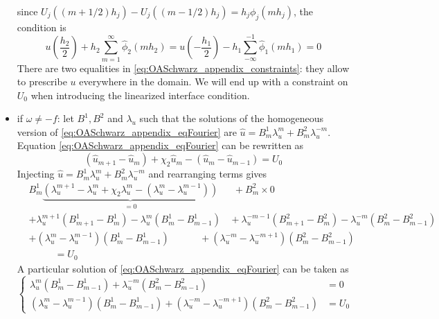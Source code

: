 \begin{appendix}
\begin{itemize}
		since $U_j((m+1/2)h_j) - U_j((m-1/2)h_j) =
		h_j \phi_j(m h_j)$,
		the condition is
	\begin{equation}
		\label{eq:OASchwarz_appendix_constraints}
		u(\frac{h_2}{2}) +
		h_2 \sum^\infty_{m=1} \widehat{\phi}_2(m h_2)
		= u(-\frac{h_1}{2})-
		h_1 \sum^{-1}_{-\infty} \widehat{\phi}_1(m h_1) = 0
	\end{equation}
	There are two equalities in
	\eqref{eq:OASchwarz_appendix_constraints}: they
	allow to prescribe $u$ everywhere in the domain.
	We will end up with a constraint on $U_0$ when
	introducing the linearized interface condition.
\item if $\omega \neq -f$:
	let $B^1, B^2$ and $\lambda_u$ such that
	the solutions of the homogeneous version of
	\eqref{eq:OASchwarz_appendix_eqFourier} are
		$\widehat{u} = B^1_m \lambda_u^m +
			B^2_m \lambda_u^{-m}$.
	Equation \eqref{eq:OASchwarz_appendix_eqFourier}
	can be rewritten as
	\begin{equation}
		(\widehat{u}_{m+1} - \widehat{u}_{m})
		+\chi_2 \widehat{u}_{m}
		- (\widehat{u}_{m} - \widehat{u}_{m-1})
		= U_0
	\end{equation}
	Injecting $\widehat{u} = B^1_m \lambda_u^m +
	B^2_m \lambda_u^{-m}$ and rearranging terms gives
\begin{equation}
	\begin{aligned}
	&B^1_m \underbrace{\left(
		\lambda_u^{m+1} - \lambda_u^m + \chi_2 \lambda_u^m
		- (\lambda_u^{m} - \lambda_u^{m-1})
		\right)}_{=0} ~~~~~~~+ B^2_m \times 0 \\
	&+ \lambda_u^{m+1} (B_{m+1}^1 - B_m^1)
		- \lambda_u^{m} (B_{m}^1 - B_{m-1}^1)
		~~~~+ \lambda_u^{-m-1} (B_{m+1}^2 - B_m^2)
		- \lambda_u^{-m} (B_{m}^2 - B_{m-1}^2)
		\\
	&+ (\lambda_u^m - \lambda_u^{m-1})(B_{m}^1 - B_{m-1}^1)
		~~~~~~~~~~~~~~+ (\lambda_u^{-m} - \lambda_u^{-m+1})
				(B_{m}^2 - B_{m-1}^2)\\
		&~~~~~~~~~~~~= U_0
	\end{aligned}
\end{equation}
A particular solution of \eqref{eq:OASchwarz_appendix_eqFourier}
can be taken as
\begin{equation}
\begin{cases}
	\lambda_u^m(B_m^1 - B_{m-1}^1)
	+ \lambda_u^{-m}(B_m^2 - B_{m-1}^2)&= 0 \\
	(\lambda_u^m - \lambda_u^{m-1})(B_m^1 - B_{m-1}^1)
	+ (\lambda_u^{-m} - \lambda_u^{-m+1})(B_m^2 - B_{m-1}^2)
	&= {U_0}
\end{cases}
\end{equation}

\end{itemize}
\end{appendix}
